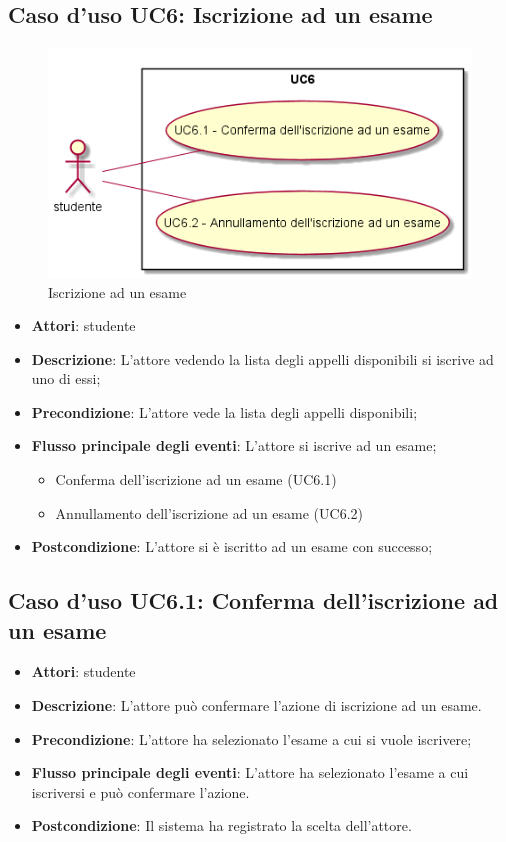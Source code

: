 \subsection{Caso d'uso \texorpdfstring{UC6}{UC6}: Iscrizione ad un esame}
\begin{figure} [H]
\centering
\includegraphics[scale=0.45]{./img/UC6.png}
\caption{Iscrizione ad un esame}\label{}
\end{figure}
\begin{itemize}
\item \textbf{Attori}: studente
\item \textbf{Descrizione}: L'attore vedendo la lista degli appelli disponibili si iscrive ad uno di essi;
\item \textbf{Precondizione}: L'attore vede la lista degli appelli disponibili;
\item \textbf{Flusso principale degli eventi}: L'attore si iscrive ad un esame;
\begin{itemize}
\item Conferma dell'iscrizione ad un esame (UC6.1)
\item Annullamento dell'iscrizione ad un esame (UC6.2)
\end{itemize}
\item \textbf{Postcondizione}: L'attore si è iscritto ad un esame con successo;
\end{itemize}
\subsection{Caso d'uso \texorpdfstring{UC6.1}{UC6.1}: Conferma dell'iscrizione ad un esame}
\begin{itemize}
\item \textbf{Attori}: studente
\item \textbf{Descrizione}: L'attore può confermare l'azione di iscrizione ad un esame.
\item \textbf{Precondizione}: L'attore ha selezionato l'esame a cui si vuole iscrivere;
\item \textbf{Flusso principale degli eventi}: L'attore ha selezionato l'esame a cui iscriversi e può confermare l'azione.
\item \textbf{Postcondizione}: Il sistema ha registrato la scelta dell'attore.
\end{itemize}
